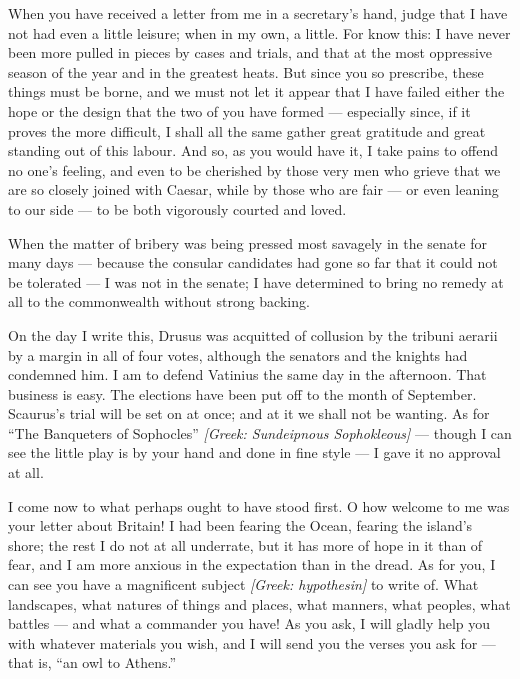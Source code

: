 

 When you have received a letter from me in a secretary's hand, judge that I have not had even a little leisure; when in my own, a little. For know this: I have never been more pulled in pieces by cases and trials, and that at the most oppressive season of the year and in the greatest heats. But since you so prescribe, these things must be borne, and we must not let it appear that I have failed either the hope or the design that the two of you have formed --- especially since, if it proves the more difficult, I shall all the same gather great gratitude and great standing out of this labour. And so, as you would have it, I take pains to offend no one's feeling, and even to be cherished by those very men who grieve that we are so closely joined with Caesar, while by those who are fair --- or even leaning to our side --- to be both vigorously courted and loved.

 When the matter of bribery was being pressed most savagely in the senate for many days --- because the consular candidates had gone so far that it could not be tolerated --- I was not in the senate; I have determined to bring no remedy at all to the commonwealth without strong backing.

 On the day I write this, Drusus was acquitted of collusion by the tribuni aerarii by a margin in all of four votes, although the senators and the knights had condemned him. I am to defend Vatinius the same day in the afternoon. That business is easy. The elections have been put off to the month of September. Scaurus's trial will be set on at once; and at it we shall not be wanting. As for ``The Banqueters of Sophocles'' \textit{[Greek: Sundeipnous Sophokleous]} --- though I can see the little play is by your hand and done in fine style --- I gave it no approval at all.

 I come now to what perhaps ought to have stood first. O how welcome to me was your letter about Britain! I had been fearing the Ocean, fearing the island's shore; the rest I do not at all underrate, but it has more of hope in it than of fear, and I am more anxious in the expectation than in the dread. As for you, I can see you have a magnificent subject \textit{[Greek: hypothesin]} to write of. What landscapes, what natures of things and places, what manners, what peoples, what battles --- and what a commander you have! As you ask, I will gladly help you with whatever materials you wish, and I will send you the verses you ask for --- that is, ``an owl to Athens.''

